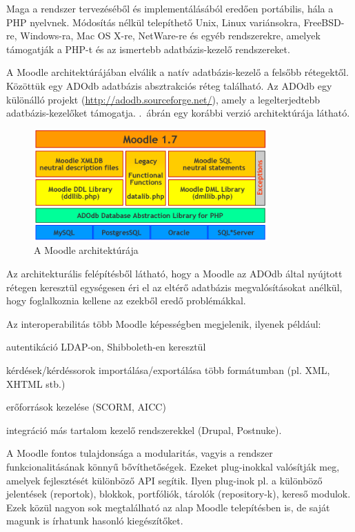 
Maga a rendszer tervezéséből és implementálásából eredően portábilis, hála a PHP nyelvnek. Módosítás nélkül telepíthető Unix, Linux variánsokra, FreeBSD-re, Windows-ra, Mac OS X-re, NetWare-re és egyéb rendszerekre, amelyek támogatják a PHP-t és az ismertebb adatbázis-kezelő rendszereket.

A Moodle architektúrájában elválik a natív adatbázis-kezelő a felsőbb rétegektől. Közöttük egy ADOdb adatbázis absztrakciós réteg található. Az ADOdb egy különálló projekt (\href{http://adodb.sourceforge.net/}{http://adodb.sourceforge.net/}), amely a legelterjedtebb adatbázis-kezelőket támogatja. .~ábrán egy korábbi verzió architektúrája látható.

\begin{figure}[h!]
\centering
\includegraphics[width=0.8\textwidth]{figures/moodlearch.png}
\caption{A Moodle architektúrája \label{fig:moodlearch}}
\end{figure}

Az architekturális felépítésből látható, hogy a Moodle az ADOdb által nyújtott rétegen keresztül egységesen éri el az eltérő adatbázis megvalósításokat anélkül, hogy foglalkoznia kellene az ezekből eredő problémákkal.  

Az interoperabilitás több Moodle képességben megjelenik, ilyenek például:
\begin{sajat_itemize}
\setlength{\itemsep}{0pt}
\item autentikáció LDAP-on, Shibboleth-en keresztül
\item kérdések/kérdéssorok importálása/exportálása több formátumban (pl. XML, XHTML stb.)
\item erőforrások kezelése (SCORM, AICC)
\item integráció más tartalom kezelő rendszerekkel (Drupal, Postnuke).
\end{sajat_itemize}

A Moodle fontos tulajdonsága a modularitás, vagyis a rendszer funkcionalitásának könnyű bővíthetőségek. Ezeket plug-inokkal valósítják meg, amelyek fejlesztését különböző API segítik. Ilyen plug-inok pl. a különböző jelentések (reportok), blokkok, portfóliók, tárolók (repository-k), kereső modulok. Ezek közül nagyon sok megtalálható az alap Moodle telepítésben is, de saját magunk is írhatunk hasonló kiegészítőket.

